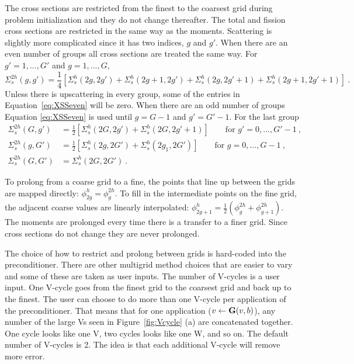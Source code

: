 The cross sections are restricted from the finest to the coarsest grid during problem initialization and they do not change thereafter. The total and fission cross sections are restricted in the same way as the moments. Scattering is slightly more complicated since it has two indices, $g$ and $g'$. When there are an even number of groups all cross sections are treated the same way. For $g' = 1,..., G'$ and $g = 1, ..., G$,
\begin{equation}
  \Sigma_s^{2h}(g,g') = \frac{1}{4}[\Sigma_s^{h}(2g,2g') + \Sigma_s^{h}(2g+1,2g') + \Sigma_s^{h}(2g,2g'+1) + \Sigma_s^{h}(2g+1,2g'+1)] \:. 
  \label{eq:XSSeven}
\end{equation}
% 
Unless there is upscattering in every group, some of the entries in Equation~\eqref{eq:XSSeven} will be zero. When there are an odd number of groups Equation \eqref{eq:XSSeven} is used until $g=G-1$ and $g'=G'-1$. For the last group
  \begin{align}
    \Sigma^{2h}_s(G,g') &= \frac{1}{2}[\Sigma^{h}_s(2G,2g') + \Sigma^{h}_s(2G,2g'+1)] \qquad \text{for } g' = 0,...,G'-1 \:,\nonumber \\
    \Sigma^{2h}_s(g,G') &=  \frac{1}{2}[\Sigma^{h}_s(2g,2G') + \Sigma^{h}_s(2g_1,2G')] \qquad \text{for } g  = 0,...,G-1 \:,\nonumber \\
    \Sigma^{2h}_s(G,G') &= \Sigma^{h}_s(2G,2G') \nonumber \:.
  \end{align}

To prolong from a coarse grid to a fine, the points that line up between the grids are mapped directly: $\phi_{2g}^{h} = \phi_{g}^{2h}$. To fill in the intermediate points on the fine grid, the adjacent coarse values are linearly interpolated: $\phi_{2g+1}^{h} = \frac{1}{2}(\phi_{g}^{2h} + \phi_{g+1}^{2h})$. The moments are prolonged every time there is a transfer to a finer grid. Since cross sections do not change they are never prolonged. 

The choice of how to restrict and prolong between grids is hard-coded into the preconditioner. There are other multigrid method choices that are easier to vary and some of these are taken as user inputs. The number of V-cycles is a user input. One V-cycle goes from the finest grid to the coarsest grid and back up to the finest. The user can choose to do more than one V-cycle per application of the preconditioner. That means that for one application ($v \leftarrow \mathbf{G}(v,b)$), any number of the large Vs seen in Figure~\ref{fig:Vcycle} (a) are concatenated together. One cycle looks like one V, two cycles looks like one W, and so on. The default number of V-cycles is 2. The idea is that each additional V-cycle will remove more error. 

